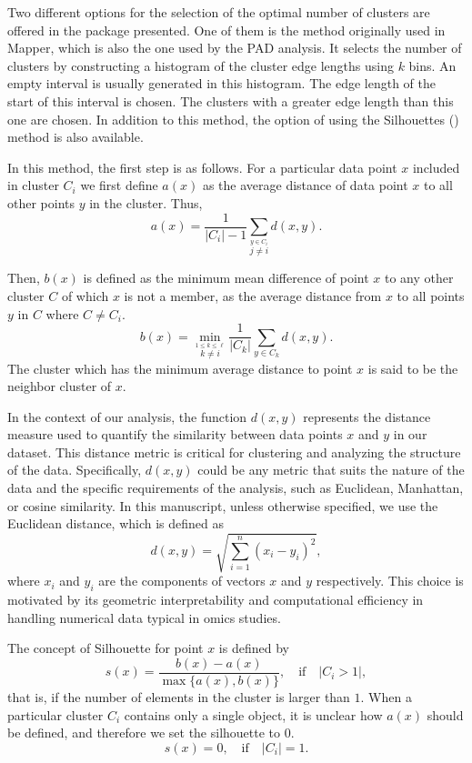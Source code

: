 Two different options for the selection of the optimal number of clusters are offered in the package presented. One of them is the method originally used in Mapper, which is also the one used by the PAD analysis. It selects the number of clusters by constructing a histogram of the cluster edge lengths using \(k\) bins. An empty interval is usually generated in this histogram. The edge length of the start of this interval is chosen. The clusters with a greater edge length than this one are chosen. In addition to this method, the option of using the Silhouettes (\citet{rousseeuw1987silhouettes}) method is also available.

In this method, the first step is as follows. For a particular data point \(x\) included in cluster \(C_{i}\) we first define \(a(x)\) as the average distance of data point \(x\) to all other points \(y\) in the cluster. Thus,
\[
a(x) = \frac{1}{|C_{i}| - 1}\sum_{\stackrel{y \in C_{i}}{j\neq i}}d(x,y).
\]

Then, \(b(x)\) is defined as the minimum mean difference of point \(x\) to any other cluster \(C\) of which \(x\) is not a member, as the average distance from \(x\) to all points \(y\) in \(C\) where \(C \neq C_{i}\).
\[
b(x) = \min_{\stackrel{1 \le k \le \ell}{k \neq i}}\frac{1}{|C_{k}|}\sum_{y \in C_{k}}d(x,y).
\]
The cluster which has the minimum average distance to point \(x\) is said to be the neighbor cluster of \(x\).

In the context of our analysis, the function \(d(x, y)\) represents the distance measure used to quantify the similarity between data points \(x\) and \(y\) in our dataset. This distance metric is critical for clustering and analyzing the structure of the data. Specifically, \(d(x, y)\) could be any metric that suits the nature of the data and the specific requirements of the analysis, such as Euclidean, Manhattan, or cosine similarity. In this manuscript, unless otherwise specified, we use the Euclidean distance, which is defined as
\[
d(x, y) = \sqrt{\sum_{i=1}^n (x_i - y_i)^2},
\]
where \(x_i\) and \(y_i\) are the components of vectors \(x\) and \(y\) respectively. This choice is motivated by its geometric interpretability and computational efficiency in handling numerical data typical in omics studies.

The concept of Silhouette for point \(x\) is defined by \[s(x) = \frac{b(x) - a(x)}{\max\{a(x),b(x)\}}, \quad \textrm{if} \quad |C_{i} > 1|,\] that is, if the number of elements in the cluster is larger than \(1\).
When a particular cluster \(C_{i}\) contains only a single object, it is unclear how \(a(x)\) should be defined, and therefore we set the silhouette to \(0\).
\[
s(x) = 0, \quad \textrm{if} \quad |C_{i}| = 1.
\]

